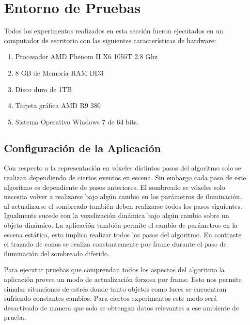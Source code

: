 \section{Entorno de Pruebas}
Todos los experimentos realizados en esta sección fueron ejecutados en un computador de escritorio con las siguientes características de hardware:

\begin{enumerate}
    \item Procesador AMD Phenom II X6 1055T 2.8 Ghz
    \item 8 GB de Memoria RAM DD3
    \item Disco duro de 1TB 
    \item Tarjeta gráfica AMD R9 380
    \item Sistema Operativo Windows 7 de 64 bits.
\end{enumerate}

\subsection{Configuración de la Aplicación}

Con respecto a la representación en vóxeles distintos pasos del algoritmo solo se realizan dependiendo de ciertos eventos en escena. Sin embargo cada paso de este algoritmo es dependiente de pasos anteriores. El sombreado se vóxeles solo necesita volver a realizarse bajo algún cambio en los parámetros de iluminación, al actualizarse el sombreado también deben realizarse todos los pasos siguientes. Igualmente sucede con la voxelización dinámica bajo algún cambio sobre un objeto dinámico. La aplicación también permite el cambio de parámetros en la escena estática, esto implica realizar todos los pasos del algoritmo. En contraste el trazado de conos se realiza constantemente por frame durante el paso de iluminación del sombreado diferido.

Para ejecutar pruebas que comprendan todos los aspectos del algoritmo la aplicación provee un modo de actualización forzosa por frame. Esto nos permite simular situaciones de estrés donde tanto objetos como luces se encuentran sufriendo constantes cambios. Para ciertos experimentos este modo será desactivado de manera que solo se obtengan datos relevantes a ese ambiente de prueba.

